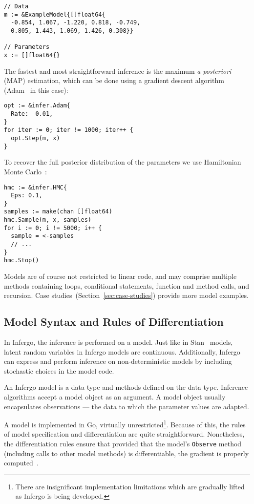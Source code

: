 \documentclass[sigplan,10pt,screen]{acmart}
\begin{document}
\begin{sloppypar}
\begin{lstlisting}
// Data
m := &ExampleModel{[]float64{
  -0.854, 1.067, -1.220, 0.818, -0.749,
  0.805, 1.443, 1.069, 1.426, 0.308}}

// Parameters
x := []float64{}
\end{lstlisting}

The fastest and most straightforward inference is the maximum
\textit{a posteriori} (MAP) estimation, which can be done using
a gradient descent algorithm (Adam~\cite{KB15} in this case):

\begin{lstlisting}
opt := &infer.Adam{
  Rate:  0.01,
}
for iter := 0; iter != 1000; iter++ {
  opt.Step(m, x)
}
\end{lstlisting}

To recover the full posterior distribution of
the parameters we use Hamiltonian Monte Carlo~\cite{N12}:

\begin{lstlisting}
hmc := &infer.HMC{
  Eps: 0.1,
}
samples := make(chan []float64)
hmc.Sample(m, x, samples)
for i := 0; i != 5000; i++ {
  sample = <-samples
  // ...
}
hmc.Stop()
\end{lstlisting}

Models are of course not restricted to linear code, and may
comprise multiple methods containing loops, conditional
statements, function and method calls, and recursion. Case
studies~(Section~\ref{sec:case-studies}) provide more
model examples.

\subsection{Model Syntax and Rules of Differentiation}

In Infergo, the inference is performed on a model. Just like in
Stan~\cite{Stan17} models, latent random variables in Infergo
models are continuous. Additionally, Infergo can express and
perform inference on non-deterministic models by including
stochastic choices in the model code.

An Infergo model is a data type and methods defined on the data
type.  Inference algorithms accept a model object as an
argument.  A model object usually encapsulates observations ---
the data to which the parameter values are adapted.

A model is implemented in Go, virtually
unrestricted\footnote{There are insignificant implementation
limitations which are gradually lifted as Infergo is being
developed.}. Because of this, the rules of model specification
and differentiation are quite straightforward. Nonetheless, the
differentiation rules ensure that provided that the model's
\lstinline{Observe} method (including calls to other model methods)
is differentiable, the gradient is properly computed~\cite{GW08}.


\end{sloppypar}
\end{document}
